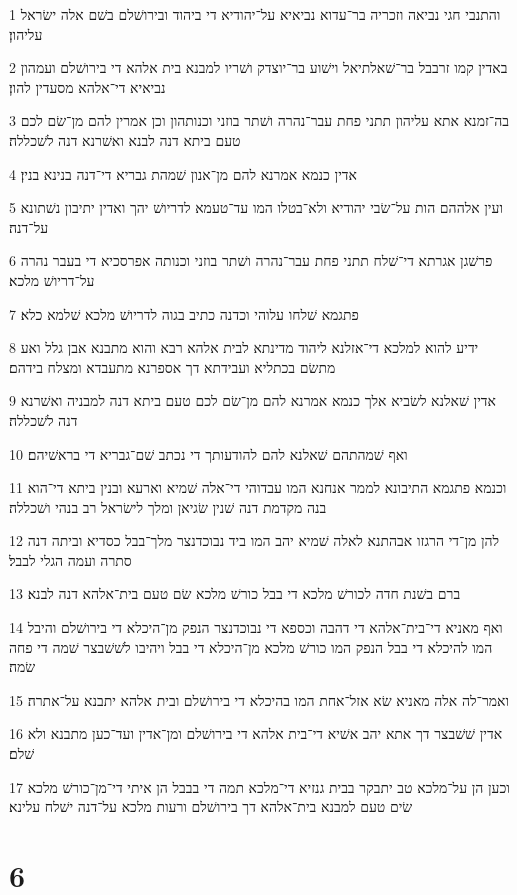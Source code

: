 \par 1 והתנבי חגי נביאה וזכריה בר־עדוא נביאיא על־יהודיא די ביהוד ובירושׁלם בשׁם אלה ישׂראל עליהון׃
\par 2 באדין קמו זרבבל בר־שׁאלתיאל וישׁוע בר־יוצדק ושׁריו למבנא בית אלהא די בירושׁלם ועמהון נביאיא די־אלהא מסעדין להון׃
\par 3 בה־זמנא אתא עליהון תתני פחת עבר־נהרה ושׁתר בוזני וכנותהון וכן אמרין להם מן־שׂם לכם טעם ביתא דנה לבנא ואשׁרנא דנה לשׁכללה׃
\par 4 אדין כנמא אמרנא להם מן־אנון שׁמהת גבריא די־דנה בנינא בנין׃
\par 5 ועין אלההם הות על־שׂבי יהודיא ולא־בטלו המו עד־טעמא לדריושׁ יהך ואדין יתיבון נשׁתונא על־דנה׃
\par 6 פרשׁגן אגרתא די־שׁלח תתני פחת עבר־נהרה ושׁתר בוזני וכנותה אפרסכיא די בעבר נהרה על־דריושׁ מלכא׃
\par 7 פתגמא שׁלחו עלוהי וכדנה כתיב בגוה לדריושׁ מלכא שׁלמא כלא׃
\par 8 ידיע להוא למלכא די־אזלנא ליהוד מדינתא לבית אלהא רבא והוא מתבנא אבן גלל ואע מתשׂם בכתליא ועבידתא דך אספרנא מתעבדא ומצלח בידהם׃
\par 9 אדין שׁאלנא לשׂביא אלך כנמא אמרנא להם מן־שׂם לכם טעם ביתא דנה למבניה ואשׁרנא דנה לשׁכללה׃
\par 10 ואף שׁמהתהם שׁאלנא להם להודעותך די נכתב שׁם־גבריא די בראשׁיהם׃
\par 11 וכנמא פתגמא התיבונא לממר אנחנא המו עבדוהי די־אלה שׁמיא וארעא ובנין ביתא די־הוא בנה מקדמת דנה שׁנין שׂגיאן ומלך לישׂראל רב בנהי ושׁכללה׃
\par 12 להן מן־די הרגזו אבהתנא לאלה שׁמיא יהב המו ביד נבוכדנצר מלך־בבל כסדיא וביתה דנה סתרה ועמה הגלי לבבל׃
\par 13 ברם בשׁנת חדה לכורשׁ מלכא די בבל כורשׁ מלכא שׂם טעם בית־אלהא דנה לבנא׃
\par 14 ואף מאניא די־בית־אלהא די דהבה וכספא די נבוכדנצר הנפק מן־היכלא די בירושׁלם והיבל המו להיכלא די בבל הנפק המו כורשׁ מלכא מן־היכלא די בבל ויהיבו לשׁשׁבצר שׁמה די פחה שׂמה׃
\par 15 ואמר־לה אלה מאניא שׂא אזל־אחת המו בהיכלא די בירושׁלם ובית אלהא יתבנא על־אתרה׃
\par 16 אדין שׁשׁבצר דך אתא יהב אשׁיא די־בית אלהא די בירושׁלם ומן־אדין ועד־כען מתבנא ולא שׁלם׃
\par 17 וכען הן על־מלכא טב יתבקר בבית גנזיא די־מלכא תמה די בבבל הן איתי די־מן־כורשׁ מלכא שׂים טעם למבנא בית־אלהא דך בירושׁלם ורעות מלכא על־דנה ישׁלח עלינא׃

\chapter{6}

